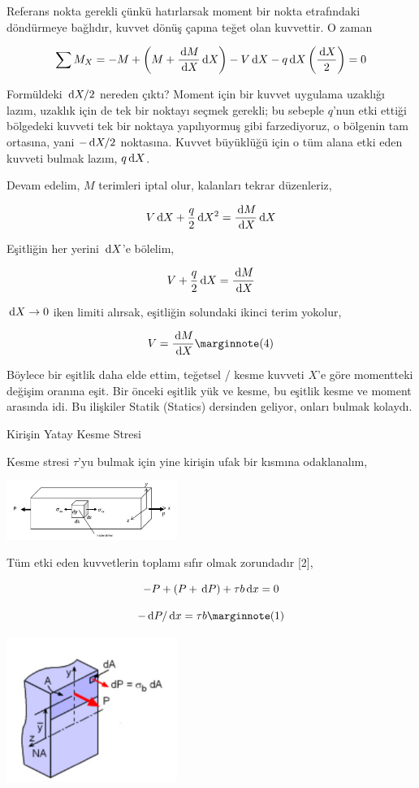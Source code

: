 \documentclass[12pt,fleqn]{article}\usepackage{../../common}
\begin{document}
Referans nokta gerekli çünkü hatırlarsak moment bir nokta etrafındaki
döndürmeye bağlıdır, kuvvet dönüş çapına teğet olan kuvvettir. O zaman 

$$
\sum M_{X} = -M + \left( M + \frac{\,\mathrm{d} M}{\,\mathrm{d} X} \,\mathrm{d} X \right) -
V \,\mathrm{d} X - q \,\mathrm{d} X \left( \frac{\,\mathrm{d} X}{2}  \right) = 0
$$

Formüldeki $\,\mathrm{d} X / 2$ nereden çıktı? Moment için bir kuvvet uygulama uzaklığı
lazım, uzaklık için de tek bir noktayı seçmek gerekli; bu sebeple $q$'nun etki
ettiği bölgedeki kuvveti tek bir noktaya yapılıyormuş gibi farzediyoruz, o
bölgenin tam ortasına, yani $- \,\mathrm{d} X / 2$ noktasına.  Kuvvet büyüklüğü için o
tüm alana etki eden kuvveti bulmak lazım, $q \,\mathrm{d} X$.

Devam edelim, $M$ terimleri iptal olur, kalanları tekrar düzenleriz,

$$
V \,\mathrm{d} X + \frac{q}{2} \,\mathrm{d} X^2 = \frac{\,\mathrm{d} M}{\,\mathrm{d} X} \,\mathrm{d} X
$$

Eşitliğin her yerini $\,\mathrm{d} X$'e bölelim,

$$
V + \frac{q}{2} \,\mathrm{d} X = \frac{\,\mathrm{d} M}{\,\mathrm{d} X} 
$$

$\,\mathrm{d} X \to 0$ iken limiti alırsak, eşitliğin solundaki ikinci terim yokolur,

$$
V = \frac{\ud M}{\ud X}
\mlabel{4}
$$

Böylece bir eşitlik daha elde ettim, teğetsel / kesme kuvveti $X$'e göre
momentteki değişim oranına eşit. Bir önceki eşitlik yük ve kesme, bu eşitlik
kesme ve moment arasında idi. Bu ilişkiler Statik (Statics) dersinden
geliyor, onları bulmak kolaydı.

Kirişin Yatay Kesme Stresi

Kesme stresi $\tau$'yu bulmak için yine kirişin ufak bir kısmına odaklanalım,

\includegraphics[width=15em]{phy_020_strs_00_06.jpg}

Tüm etki eden kuvvetlerin toplamı sıfır olmak zorundadır [2],

$$
-P + (P + \,\mathrm{d} P) + \tau b \,\mathrm{d} x = 0
$$

$$
-\ud P/\ud x = \tau b
\mlabel{1}
$$

\includegraphics[width=15em]{phy_020_strs_00_01.jpg}
\end{document}
